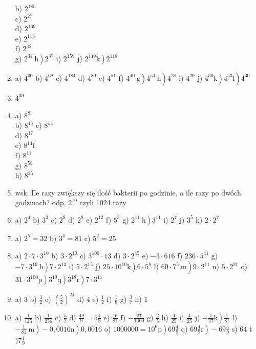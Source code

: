 \documentclass[10pt]{article}
\begin{document}
\begin{enumerate}
b) \(2^{185}\)\\
c) \(2^{27}\)\\
d) \(2^{169}\)\\
e) \(2^{113}\)\\
f) \(2^{32}\)\\
g) \(\left.2^{34} \mathrm{~h}\right) 2^{37}\) i) \(2^{159}\) j) \(\left.2^{149} \mathrm{k}\right) 2^{118}\)
  \item a) \(4^{30}\) b) \(4^{68}\) c) \(4^{184}\) d) \(4^{80}\) e) \(4^{51}\) f) \(\left.\left.4^{40} \mathrm{~g}\right) 4^{54} \mathrm{~h}\right) 4^{28}\) i) \(4^{20}\) j) \(\left.\left.4^{30} \mathrm{k}\right) 4^{53} \mathrm{l}\right) 4^{30}\)
  \item \(4^{39}\)
  \item a) \(8^{8}\)\\
b) \(8^{13}\) c) \(8^{14}\)\\
d) \(8^{17}\)\\
e) \(8^{14} \mathrm{f}\)\\
f) \(8^{11}\)\\
g) \(8^{58}\)\\
h) \(8^{25}\)
  \item wsk. Ile razy zwiększy się ilość bakterii po godzinie, a ile razy po dwóch godzinach? odp. \(2^{10}\) czyli 1024 razy
  \item a) \(2^{4}\) b) \(3^{3}\) c) \(2^{8}\) d) \(2^{8}\) e) \(2^{12}\) f) \(5^{3}\) g) \(\left.2^{11} \mathrm{~h}\right) 3^{11}\) i) \(2^{7}\) j) \(3^{5}\) k) \(2 \cdot 2^{7}\)
  \item a) \(2^{5}=32\) b) \(3^{4}=81\) c) \(5^{2}=25\)
  \item a) \(2 \cdot 7 \cdot 3^{10}\) b) \(3 \cdot 2^{10}\) c) \(3^{100} \cdot 13\) d) \(3 \cdot 2^{45}\) e) \(-3 \cdot 616\) f) \(236 \cdot 5^{41}\) g) \(\left.-7 \cdot 3^{19} \mathrm{~h}\right) 7 \cdot 2^{13}\) i) \(5 \cdot 2^{15}\) j) \(\left.25 \cdot 10^{10} \mathrm{k}\right) 6 \cdot 5^{8}\) l) \(\left.60 \cdot 7^{5} \mathrm{~m}\right) 9 \cdot 2^{11}\) n) \(5 \cdot 2^{21}\) o) \(\left.\left.\left.31 \cdot 3^{100} \mathrm{p}\right) 3^{19} \mathrm{q}\right) 3^{18} \mathrm{r}\right) 7 \cdot 3^{11}\)
  \item a) 3 b) \(\frac{3}{2}\) c) \(\left(\frac{5}{2}\right)^{24}\) d) 4 e) \(\frac{1}{2}\) f) \(\frac{1}{8}\) g) \(\frac{3}{7}\) h) 1
  \item a) \(\frac{1}{125}\) b) \(\frac{1}{256}\) c) \(\frac{5}{2}\) d) \(\frac{49}{9}=5 \frac{4}{9}\) e) \(\frac{16}{81}\) f) \(-\frac{27}{1000}\) g) \(\frac{2}{5}\) h) \(\frac{4}{25}\) i) \(\frac{4}{25}\) j) \(\left.-\frac{1}{27} \mathrm{k}\right) \frac{1}{81}\) l) \(\left.\left.-\frac{1}{81} \mathrm{~m}\right)-0,0016 \mathrm{n}\right) 0,0016\) o) \(\left.1000000=10^{6} \mathrm{p}\right) 69 \frac{4}{9}\) q) \(\left.69 \frac{4}{9} \mathrm{r}\right)-69 \frac{4}{9}\) s) 64 t\() 7 \frac{1}{9}\)

\end{enumerate}
\end{document}
